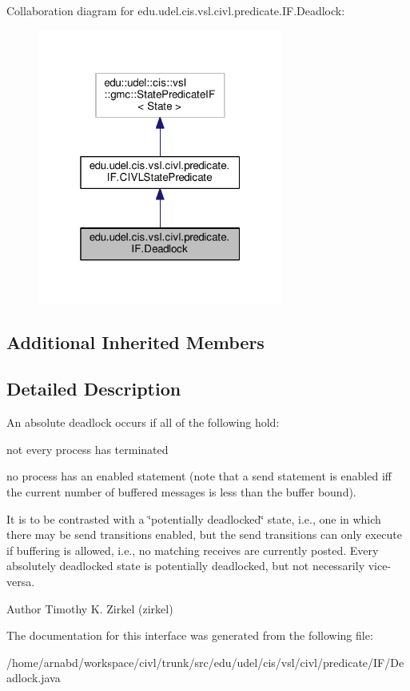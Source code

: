 Collaboration diagram for edu.\+udel.\+cis.\+vsl.\+civl.\+predicate.\+I\+F.\+Deadlock\+:
\nopagebreak
\begin{figure}[H]
\begin{center}
\leavevmode
\includegraphics[width=229pt]{interfaceedu_1_1udel_1_1cis_1_1vsl_1_1civl_1_1predicate_1_1IF_1_1Deadlock__coll__graph}
\end{center}
\end{figure}
\subsection*{Additional Inherited Members}


\subsection{Detailed Description}
An absolute deadlock occurs if all of the following hold\+: 


\begin{DoxyEnumerate}
\item not every process has terminated 
\item no process has an enabled statement (note that a send statement is enabled iff the current number of buffered messages is less than the buffer bound). 
\end{DoxyEnumerate}

It is to be contrasted with a \char`\"{}potentially deadlocked\char`\"{} state, i.\+e., one in which there may be send transitions enabled, but the send transitions can only execute if buffering is allowed, i.\+e., no matching receives are currently posted. Every absolutely deadlocked state is potentially deadlocked, but not necessarily vice-\/versa.

\begin{DoxyAuthor}{Author}
Timothy K. Zirkel (zirkel) 
\end{DoxyAuthor}


The documentation for this interface was generated from the following file\+:\begin{DoxyCompactItemize}
\item 
/home/arnabd/workspace/civl/trunk/src/edu/udel/cis/vsl/civl/predicate/\+I\+F/Deadlock.\+java\end{DoxyCompactItemize}
